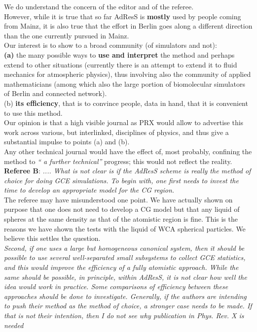 \documentclass[12pt,a4paper]{article}
\begin{document}
We do understand the concern of the editor and of the referee.\\
However, while it is true that so far AdResS is {\bf mostly} used by people coming from Mainz,
it is also true that the effort in Berlin goes along a different direction than the one currently pursued 
in Mainz.\\
Our interest is to show to a broad community (of simulators and not):\\
{\bf (a)} the many possible ways to {\bf use and interpret} the method and perhaps extend to other situations (currently there is an attempt to extend it to fluid mechanics for atmospheric physics), thus involving also the community of applied mathematicians (among which also the large portion of biomolecular simulators of Berlin and connected network).\\

(b) {\bf its efficiency}, that is to convince people, data in hand, that it is convenient to use this method.\\

Our opinion is that a high visible journal as PRX would allow to advertise this work across various, but interlinked, disciplines of physics, and thus give a substantial impulse to points (a) and (b).\\
Any other technical journal would have the effect of, most probably, confining the method to {\it `` a further technical''} progress; this would not reflect the reality.\\


{\bf Referee B}:
{\color{teal} {\it.... What is not
clear is if the AdResS scheme is really the method of choice for doing GCE simulations. To begin with,
one first needs to invest the time to develop an appropriate model for the CG region.}}\\

The referee may have misunderstood one point. We have actually shown on purpose that one does not need to develop a CG model but that any liquid of spheres at the same density as that of the atomistic region is fine.
This is the reasons we have shown the tests with the liquid of WCA spherical particles. We believe this settles the question.\\

{\color{teal} {\it Second, if one uses
a large but homogeneous canonical system, then it should be possible to use several well-separated small
subsystems to collect GCE statistics, and this would improve the efficiency of a fully atomistic approach.
While the same should be possible, in principle, within AdResS, it is not clear how well the idea would
work in practice. Some comparisons of efficiency between these approaches should be done to investigate.
Generally, if the authors are intending to push their method as the method of choice, a stronger case
needs to be made. If that is not their intention, then I do not see why publication in Phys. Rev. X is
needed}}\\
\end{document}
